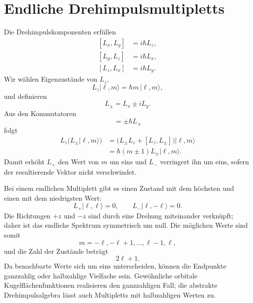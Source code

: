 \section{Endliche Drehimpulsmultipletts}

Die Drehimpulskomponenten erfüllen
\begin{equation}
\begin{aligned}
[L_x,L_y]&=i\hbar L_z,\\
[L_y,L_z]&=i\hbar L_x,\\
[L_z,L_x]&=i\hbar L_y.
\end{aligned}
\end{equation}
Wir wählen Eigenzustände von \(L_z\),
\begin{equation}
L_z|\ell,m\rangle=\hbar m\,|\ell,m\rangle,
\end{equation}
und definieren
\begin{equation}
L_\pm=L_x\pm iL_y.
\end{equation}
Aus den Kommutatoren
\begin{equation}
[L_z,L_\pm]=\pm\hbar L_\pm
\end{equation}
folgt
\begin{align}
L_z\bigl(L_\pm|\ell,m\rangle\bigr)
&=\bigl(L_\pm L_z+[L_z,L_\pm]\bigr)|\ell,m\rangle \\
&=\hbar(m\pm1)L_\pm|\ell,m\rangle.
\end{align}
Damit erhöht \(L_+\) den Wert von \(m\) um eins und \(L_-\) verringert ihn um eins, sofern der resultierende Vektor nicht verschwindet.

Bei einem endlichen Multiplett gibt es einen Zustand mit dem höchsten und einen mit dem niedrigsten Wert:
\begin{equation}
L_+|\ell,\ell\rangle=0,
\qquad
L_-|\ell,-\ell\rangle=0.
\end{equation}
Die Richtungen \(+z\) und \(-z\) sind durch eine Drehung miteinander verknüpft; daher ist das endliche Spektrum symmetrisch um null. Die möglichen Werte sind somit
\begin{equation}
m=-\ell,-\ell+1,\ldots,\ell-1,\ell,
\end{equation}
und die Zahl der Zustände beträgt
\begin{equation}
2\ell+1.
\end{equation}
Da benachbarte Werte sich um eins unterscheiden, können die Endpunkte ganzzahlig oder halbzahlige Vielfache sein. Gewöhnliche orbitale Kugelflächenfunktionen realisieren den ganzzahligen Fall; die abstrakte Drehimpulsalgebra lässt auch Multipletts mit halbzahligen Werten zu.

